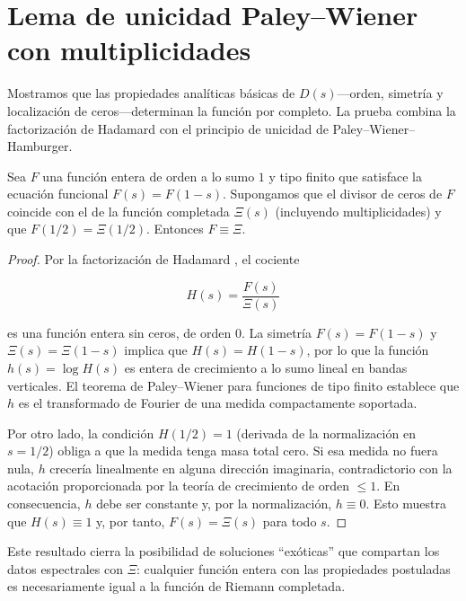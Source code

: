 \section{Lema de unicidad Paley--Wiener con multiplicidades}

Mostramos que las propiedades analíticas básicas de $D(s)$---orden, simetría y
localización de ceros---determinan la función por completo.  La prueba combina la
factorización de Hadamard con el principio de unicidad de Paley--Wiener--Hamburger.

\begin{lemma}\label{lem:unicidad-paley-wiener}
Sea $F$ una función entera de orden a lo sumo $1$ y tipo finito que satisface la
ecuación funcional $F(s)=F(1-s)$.  Supongamos que el divisor de ceros de $F$
coincide con el de la función completada $\Xi(s)$ (incluyendo multiplicidades) y
que $F(1/2)=\Xi(1/2)$.  Entonces $F\equiv \Xi$.
\end{lemma}

\begin{proof}
Por la factorización de Hadamard \cite[Cap.~II]{Tate1967}, el cociente

\[
 H(s)=\frac{F(s)}{\Xi(s)}
\]

es una función entera sin ceros, de orden $0$.  La simetría $F(s)=F(1-s)$ y
$\Xi(s)=\Xi(1-s)$ implica que $H(s)=H(1-s)$, por lo que la función $h(s)=\log H(s)$
es entera de crecimiento a lo sumo lineal en bandas verticales.  El teorema de
Paley--Wiener para funciones de tipo finito \cite[Thm.~VII]{Weil1964} establece que
$h$ es el transformado de Fourier de una medida compactamente soportada.

Por otro lado, la condición $H(1/2)=1$ (derivada de la normalización en
$s=1/2$) obliga a que la medida tenga masa total cero.  Si esa medida no fuera
nula, $h$ crecería linealmente en alguna dirección imaginaria, contradictorio con
la acotación proporcionada por la teoría de crecimiento de orden $\leqslant1$.
En consecuencia, $h$ debe ser constante y, por la normalización, $h\equiv0$.
Esto muestra que $H(s)\equiv1$ y, por tanto, $F(s)=\Xi(s)$ para todo $s$.
\end{proof}

Este resultado cierra la posibilidad de soluciones ``exóticas'' que compartan los
datos espectrales con $\Xi$: cualquier función entera con las propiedades
postuladas es necesariamente igual a la función de Riemann completada.
